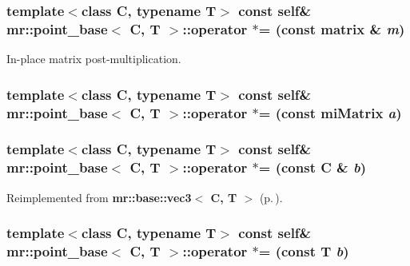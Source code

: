 \subsubsection{\setlength{\rightskip}{0pt plus 5cm}template$<$class C, typename T$>$ const {\bf self}\& {\bf mr::point\_\-base}$<$ C, T $>$::operator $\ast$= (const {\bf matrix} \& {\em m})\hspace{0.3cm}{\tt  [inline]}}\label{structmr_1_1point__base_z78_4}


In-place matrix post-multiplication. 

\subsubsection{\setlength{\rightskip}{0pt plus 5cm}template$<$class C, typename T$>$ const {\bf self}\& {\bf mr::point\_\-base}$<$ C, T $>$::operator $\ast$= (const mi\-Matrix {\em a})\hspace{0.3cm}{\tt  [inline]}}\label{structmr_1_1point__base_z78_2}


\subsubsection{\setlength{\rightskip}{0pt plus 5cm}template$<$class C, typename T$>$ const {\bf self}\& {\bf mr::point\_\-base}$<$ C, T $>$::operator $\ast$= (const C \& {\em b})\hspace{0.3cm}{\tt  [inline]}}\label{structmr_1_1point__base_z78_1}




Reimplemented from {\bf mr::base::vec3$<$ C, T $>$} {\rm (p.\,\pageref{structmr_1_1base_1_1vec3_z40_8})}.
\subsubsection{\setlength{\rightskip}{0pt plus 5cm}template$<$class C, typename T$>$ const {\bf self}\& {\bf mr::point\_\-base}$<$ C, T $>$::operator $\ast$= (const T {\em b})\hspace{0.3cm}{\tt  [inline]}}\label{structmr_1_1point__base_z78_0}




